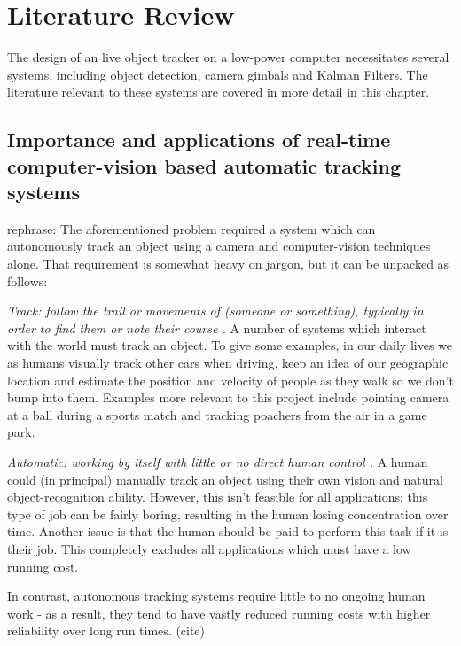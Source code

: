 \chapter{Literature Review}

The design of an live object tracker on a low-power computer necessitates several systems, including object detection, camera gimbals and Kalman Filters. The literature relevant to these systems are covered in more detail in this chapter.

\section{Importance and applications of real-time computer-vision based automatic tracking systems}\label{sec:compare_cv_techniques}
{\color{red} rephrase:} The aforementioned problem required a system which can autonomously track an object using a camera and computer-vision techniques alone. That requirement is somewhat heavy on jargon, but it can be unpacked as follows:



\textit{Track: follow the trail or movements of (someone or something), typically in order to find them or note their course \cite{website:definition_track}.}
%
A number of systems which interact with the world must track an object. To give some examples, in our daily lives we as humans visually track other cars when driving, keep an idea of our geographic location and estimate the position and velocity of people as they walk so we don't bump into them. Examples more relevant to this project include pointing camera at a ball during a sports match and tracking poachers from the air in a game park.



\textit{Automatic: working by itself with little or no direct human control \cite{website:definition_automation}.}
%
A human could (in principal) manually track an object using their own vision and natural object-recognition ability. However, this isn't feasible for all applications: this type of job can be fairly boring, resulting in the human losing concentration over time. Another issue is that the human should be paid to perform this task if it is their job. This completely excludes all applications which must have a low running cost.

In contrast, autonomous tracking systems require little to no ongoing human work - as a result, they tend to have vastly reduced running costs with higher reliability over long run times. {\color{red} (cite)}




